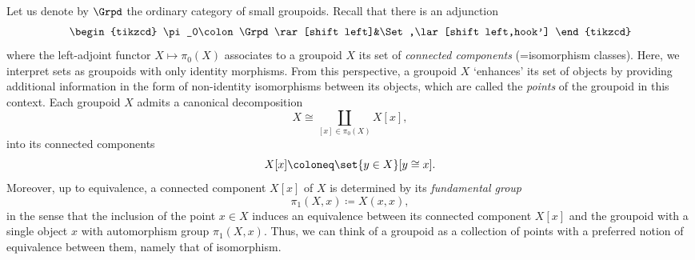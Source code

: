 \documentclass[a4paper]{amsart}
\begin{document}
Let us denote by $\Grpd$ the ordinary category of small groupoids. Recall that
there is an adjunction
\[
  \begin{tikzcd}
    \pi_0\colon\Grpd\rar[shift left]&\Set,\lar[shift left,hook']
  \end{tikzcd}
\]
where the left-adjoint functor $X\mapsto\pi_0(X)$ associates to a groupoid $X$
its set of \emph{connected components} (=isomorphism classes). Here, we
interpret sets as groupoids with only identity morphisms. From this
perspective, a groupoid $X$ `enhances' its set of objects by providing
additional information in the form of non-identity isomorphisms between its
objects, which are called the \emph{points} of the groupoid in this context.
Each groupoid $X$ admits a canonical decomposition
\[
  X\cong\coprod_{[x]\in\pi_0(X)}X[x],
\]
into its connected components
\[
  X[x]\coloneq\set{y\in X}[y\cong x].
\]
Moreover, up to equivalence, a connected component $X[x]$ of $X$ is determined by its
\emph{fundamental group}
\[
  \pi_1(X,x)\coloneqq X(x,x),
\]
in the sense that the inclusion of the point $x\in X$ induces an equivalence
between its connected component $X[x]$ and the groupoid with a single object $x$
with automorphism group $\pi_1(X,x)$. Thus, we can think of a groupoid as a
collection of points with a preferred notion of equivalence between them, namely
that of isomorphism.
\end{document}
